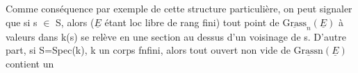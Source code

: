 Comme conséquence par exemple de cette structure particulière,
on peut signaler que si s $\in$ S, alors ($\underline{E}$ étant loc libre de rang fini)
tout point de $\underline{\text{Grass}}_n(\underline{E})$  à valeurs dans k(s)  se relève en une section
au dessus d'un voisinage de s.  D'autre part, si S=Spec(k),  k
un corps fnfini, alors tout ouvert non vide de $\underline{\text{Grassn}}(\underline{E})$  contient un

